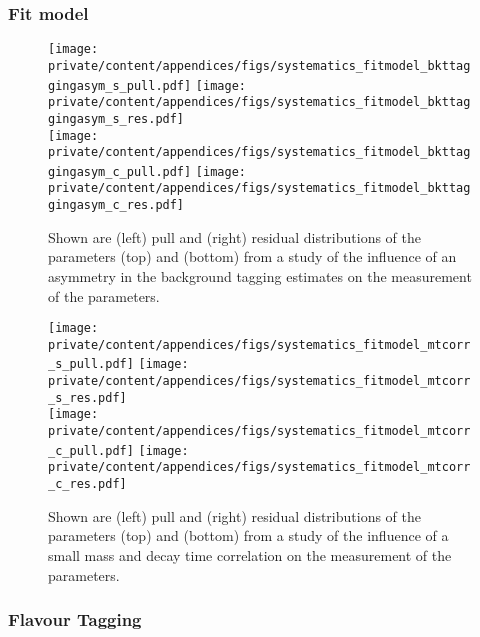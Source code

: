 \subsubsection{Fit model}
\label{sec:app:measurement_of_sin2beta:systematics:systematics:fit_model}

\begin{figure}[h]
\centering
  \texttt{[image: private/content/appendices/figs/systematics\_fitmodel\_bkttaggingasym\_s\_pull.pdf]}\hfill
  \texttt{[image: private/content/appendices/figs/systematics\_fitmodel\_bkttaggingasym\_s\_res.pdf]}\\
  \texttt{[image: private/content/appendices/figs/systematics\_fitmodel\_bkttaggingasym\_c\_pull.pdf]}\hfill
  \texttt{[image: private/content/appendices/figs/systematics\_fitmodel\_bkttaggingasym\_c\_res.pdf]}
\caption{Shown are (left) pull and (right) residual distributions of the
parameters (top) \SJpsiKS and (bottom) \CJpsiKS from a \ToyMC study of the
influence of an asymmetry in the background tagging estimates on the measurement
of the \CP parameters.}
\label{fig:app:measurement_of_sin2beta:systematics:systematics:fit_model:bkg_tagging_asymmetry}
\end{figure}

\begin{figure}[h]
\centering
  \texttt{[image: private/content/appendices/figs/systematics\_fitmodel\_mtcorr\_s\_pull.pdf]}\hfill
  \texttt{[image: private/content/appendices/figs/systematics\_fitmodel\_mtcorr\_s\_res.pdf]}\\
  \texttt{[image: private/content/appendices/figs/systematics\_fitmodel\_mtcorr\_c\_pull.pdf]}\hfill
  \texttt{[image: private/content/appendices/figs/systematics\_fitmodel\_mtcorr\_c\_res.pdf]}
\caption{Shown are (left) pull and (right) residual distributions of the
parameters (top) \SJpsiKS and (bottom) \CJpsiKS from a \ToyMC study of the
influence of a small mass and decay time correlation on the measurement of the
\CP parameters.}
\label{fig:app:measurement_of_sin2beta:systematics:systematics:fit_model:mass_time_correlations}
\end{figure}

\clearpage
\subsubsection{Flavour Tagging}
\label{sec:app:measurement_of_sin2beta:systematics:systematics:tagging}

